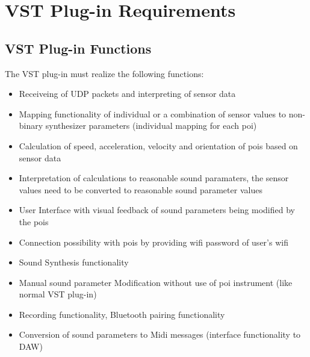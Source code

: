 \newpage
\section{VST Plug-in Requirements}

\subsection{VST Plug-in Functions}
\begin{description}
	\item The VST plug-in must realize the following functions:
\end{description}
\begin{itemize}
	\item Receiveing of UDP packets and interpreting of sensor data
	\item Mapping functionality of individual or a combination of sensor values to non-binary synthesizer parameters (individual mapping for each poi)
	\item Calculation of speed, acceleration, velocity and orientation of pois based on sensor data
	\item Interpretation of calculations to reasonable sound paramaters, the sensor values need to be converted to reasonable sound parameter values
	\item User Interface with visual feedback of sound parameters being modified by the pois
	\item Connection possibility with pois by providing wifi password of user's wifi
	\item Sound Synthesis functionality
	\item Manual sound parameter Modification without use of poi instrument (like normal VST plug-in)
	\item Recording functionality, Bluetooth pairing functionality
	\item Conversion of sound parameters to Midi messages (interface functionality to DAW)
\end{itemize}
\newpage

